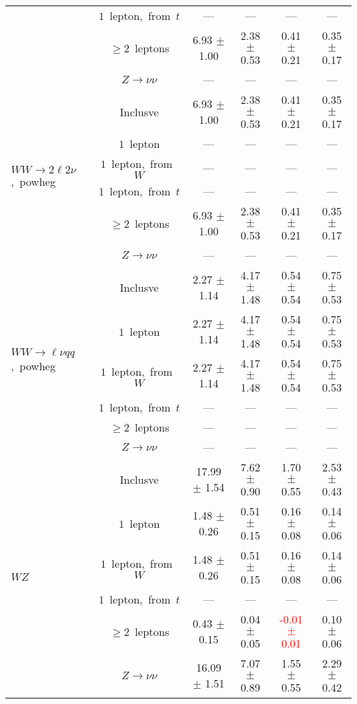 \documentclass{article}
\begin{document}
\begin{longtable}{|l|c|c|c|c|c|}
 & $1$~lepton,~from~$t$  & ---  & ---  & ---  & --- \\* 
 & $\ge2$~leptons  & 6.93 $\pm$ 1.00  & 2.38 $\pm$ 0.53  & 0.41 $\pm$ 0.21  & 0.35 $\pm$ 0.17 \\* 
 & $Z\rightarrow\nu\nu$  & ---  & ---  & ---  & --- \\* 
\hline 
\multirow{6}{*}{$WW{\rightarrow}2\ell2\nu$,~powheg} & Inclusve  & 6.93 $\pm$ 1.00  & 2.38 $\pm$ 0.53  & 0.41 $\pm$ 0.21  & 0.35 $\pm$ 0.17 \\* 
 & $1$~lepton  & ---  & ---  & ---  & --- \\* 
 & $1$~lepton,~from~$W$  & ---  & ---  & ---  & --- \\* 
 & $1$~lepton,~from~$t$  & ---  & ---  & ---  & --- \\* 
 & $\ge2$~leptons  & 6.93 $\pm$ 1.00  & 2.38 $\pm$ 0.53  & 0.41 $\pm$ 0.21  & 0.35 $\pm$ 0.17 \\* 
 & $Z\rightarrow\nu\nu$  & ---  & ---  & ---  & --- \\* 
\hline 
\multirow{6}{*}{$WW{\rightarrow}{\ell}{\nu}qq$,~powheg} & Inclusve  & 2.27 $\pm$ 1.14  & 4.17 $\pm$ 1.48  & 0.54 $\pm$ 0.54  & 0.75 $\pm$ 0.53 \\* 
 & $1$~lepton  & 2.27 $\pm$ 1.14  & 4.17 $\pm$ 1.48  & 0.54 $\pm$ 0.54  & 0.75 $\pm$ 0.53 \\* 
 & $1$~lepton,~from~$W$  & 2.27 $\pm$ 1.14  & 4.17 $\pm$ 1.48  & 0.54 $\pm$ 0.54  & 0.75 $\pm$ 0.53 \\* 
 & $1$~lepton,~from~$t$  & ---  & ---  & ---  & --- \\* 
 & $\ge2$~leptons  & ---  & ---  & ---  & --- \\* 
 & $Z\rightarrow\nu\nu$  & ---  & ---  & ---  & --- \\* 
\hline 
\multirow{6}{*}{$WZ$} & Inclusve  & 17.99 $\pm$ 1.54  & 7.62 $\pm$ 0.90  & 1.70 $\pm$ 0.55  & 2.53 $\pm$ 0.43 \\* 
 & $1$~lepton  & 1.48 $\pm$ 0.26  & 0.51 $\pm$ 0.15  & 0.16 $\pm$ 0.08  & 0.14 $\pm$ 0.06 \\* 
 & $1$~lepton,~from~$W$  & 1.48 $\pm$ 0.26  & 0.51 $\pm$ 0.15  & 0.16 $\pm$ 0.08  & 0.14 $\pm$ 0.06 \\* 
 & $1$~lepton,~from~$t$  & ---  & ---  & ---  & --- \\* 
 & $\ge2$~leptons  & 0.43 $\pm$ 0.15  & 0.04 $\pm$ 0.05  & \textcolor{red}{ -0.01 $\pm$ 0.01 }  & 0.10 $\pm$ 0.06 \\* 
 & $Z\rightarrow\nu\nu$  & 16.09 $\pm$ 1.51  & 7.07 $\pm$ 0.89  & 1.55 $\pm$ 0.55  & 2.29 $\pm$ 0.42 \\* 

\end{longtable}
\end{document}
